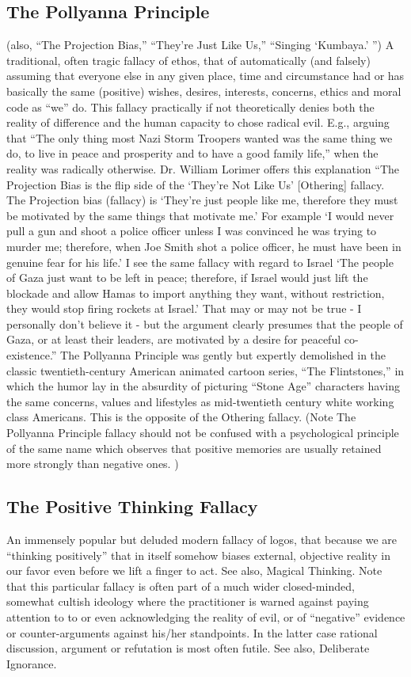 \documentclass[10pt,a4paper,british]{article}
\begin{document}
\begin{multicols}{2}
	\subsection{The Pollyanna Principle} (also, ``The Projection Bias,'' ``They're Just Like Us,'' ``Singing `Kumbaya.' '')  A traditional, often tragic fallacy of ethos, that of automatically (and falsely) assuming that everyone else in any given place, time and circumstance had or has basically the same (positive) wishes, desires, interests, concerns, ethics and moral code as ``we'' do. This fallacy practically if not theoretically denies both the reality of difference and the human capacity to chose radical evil.  E.g., arguing that ``The only thing most Nazi Storm Troopers wanted was the same thing we do, to live in peace and prosperity and to have a good family life,'' when the reality was radically otherwise. Dr.  William Lorimer offers this explanation ``The Projection Bias is the flip side of the `They're Not Like Us' [Othering] fallacy. The Projection bias (fallacy) is `They're just people like me, therefore they must be motivated by the same things that motivate me.' For example `I would never pull a gun and shoot a police officer unless I was convinced he was trying to murder me; therefore, when Joe Smith shot a police officer, he must have been in genuine fear for his life.' I see the same fallacy with regard to Israel `The people of Gaza just want to be left in peace; therefore, if Israel would just lift the blockade and allow Hamas to import anything they want, without restriction, they would stop firing rockets at Israel.' That may or may not be true {-} I personally don't believe it {-} but the argument clearly presumes that the people of Gaza, or at least their leaders, are motivated by a desire for peaceful co{-}existence.'' The Pollyanna Principle was gently but expertly demolished in the classic twentieth{-}century American animated cartoon series, ``The Flintstones,'' in which the humor lay in the absurdity of picturing ``Stone Age'' characters having the same concerns, values and lifestyles as mid{-}twentieth century white working class Americans.  This is the opposite of the Othering fallacy. (Note The Pollyanna Principle fallacy should not be confused with a psychological principle of the same name which observes that positive memories are usually retained more strongly than negative ones. )   

	\subsection{The Positive Thinking Fallacy} An immensely popular but deluded modern fallacy of logos, that because we are ``thinking positively'' that in itself somehow biases external, objective reality in our favor even before we lift a finger to act. See also, Magical Thinking. Note that this particular fallacy is often part of a much wider closed{-}minded, somewhat cultish ideology where the practitioner is warned against paying attention to to or even acknowledging the reality of evil, or of ``negative'' evidence or counter{-}arguments against his/her standpoints. In the latter case rational discussion, argument or refutation is most often futile. See also, Deliberate Ignorance.  


\end{multicols}
\end{document}
